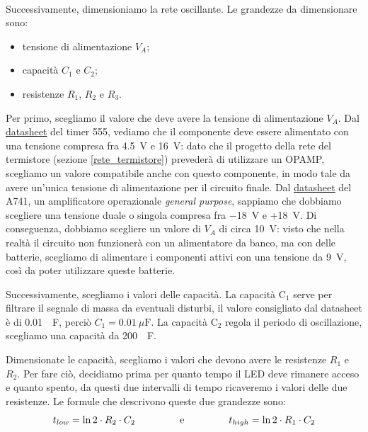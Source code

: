 \documentclass{report}
\begin{document}
\\Successivamente, dimensioniamo la rete oscillante. Le grandezze da dimensionare sono:
\begin{itemize}
\item tensione di alimentazione $V_A$;
\item capacità $C_1$ e $C_2$;
\item resistenze $R_1$, $R_2$ e $R_3$.
\end{itemize}
Per primo, scegliamo il valore che deve avere la tensione di alimentazione $V_A$. Dal \textcolor{blue}{\underline{\href{https://www.ti.com/lit/ds/symlink/lm555.pdf?ts=1667144089940&ref_url=https\%253A\%252F\%252Fwww.ti.com\%252Fproduct\%252FLM555}{datasheet}}} del timer 555, vediamo che il componente deve essere alimentato con una tensione compresa fra \SI{4.5}{\volt} e \SI{16}{\volt}: dato che il progetto della rete del termistore (sezione \ref{rete_termistore}) prevederà di utilizzare un OPAMP, scegliamo un valore compatibile anche con questo componente, in modo tale da avere un'unica tensione di alimentazione per il circuito finale. Dal \textcolor{blue}{\underline{\href{https://www.ti.com/lit/ds/symlink/ua741.pdf?ts=1672216941275&ref_url=https\%253A\%252F\%252Fwww.ti.com\%252Fproduct\%252FUA741}{datasheet}}} del \textmu A741, un amplificatore operazionale \textit{general purpose}, sappiamo che dobbiamo scegliere una tensione duale o singola compresa fra \SI{-18}{\volt} e +\SI{18}{\volt}. Di conseguenza, dobbiamo scegliere un valore di  $V_A$ di circa \SI{10}{\volt}: visto che nella realtà il circuito non funzionerà con un alimentatore da banco, ma con delle batterie, scegliamo di alimentare i componenti attivi con una tensione da \SI{9}{\volt}, così da poter utilizzare queste batterie. \par
Successivamente, scegliamo i valori delle capacità. La capacità $\mathrm{C_1}$ serve per filtrare il segnale di massa da eventuali disturbi, il valore consigliato dal datasheet è di \SI{0.01}{\mu\farad}, perciò $\displaystyle{C_1=\SI{0.01}{\mu\farad}}$. La capacità $\mathrm{C_2}$ regola il periodo di oscillazione, scegliamo una capacità da \SI{200}{\mu\farad}. \par
Dimensionate le capacità, scegliamo i valori che devono avere le resistenze $R_1$ e $R_2$. Per fare ciò, decidiamo prima per quanto tempo il LED deve rimanere acceso e quanto spento, da questi due intervalli di tempo ricaveremo i valori delle due resistenze. Le formule che descrivono queste due grandezze sono:
\\$$t_{low}=\ln2\cdot R_2\cdot C_2\indent\indent\indent \mathrm{e}\indent\indent\indent t_{high}=\ln2\cdot R_1\cdot C_2$$
\end{document}
